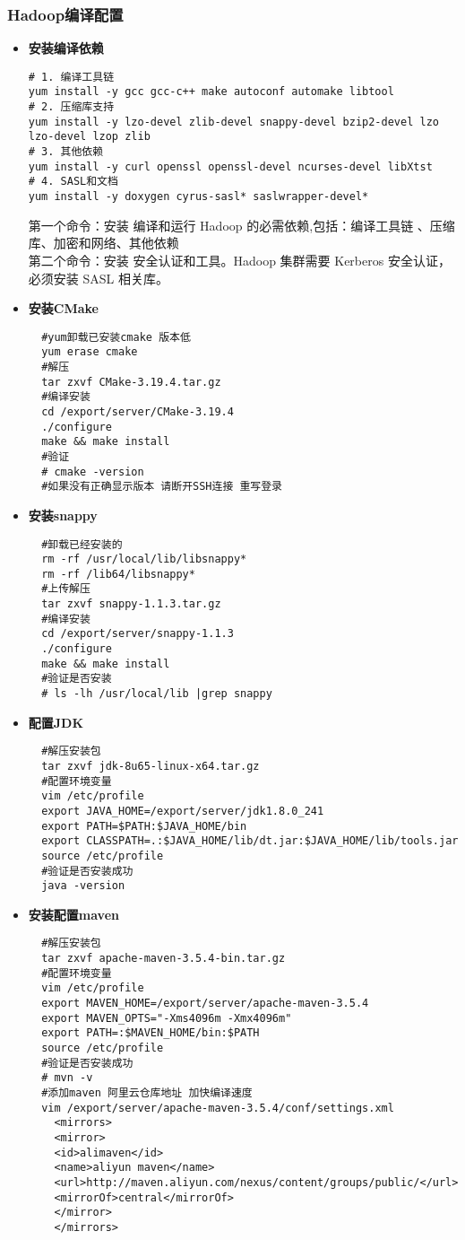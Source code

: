 \documentclass[bachelor]{thesis-uestc}
\begin{document}
\subsubsection{Hadoop编译配置}

\begin{itemize}
\item \textbf{安装编译依赖}
\begin{verbatim}
# 1. 编译工具链
yum install -y gcc gcc-c++ make autoconf automake libtool
# 2. 压缩库支持
yum install -y lzo-devel zlib-devel snappy-devel bzip2-devel lzo 
lzo-devel lzop zlib
# 3. 其他依赖
yum install -y curl openssl openssl-devel ncurses-devel libXtst
# 4. SASL和文档
yum install -y doxygen cyrus-sasl* saslwrapper-devel*
\end{verbatim}
第一个命令：安装 编译和运行 Hadoop 的必需依赖,包括：编译工具链 、压缩库、加密和网络、其他依赖
\\第二个命令：安装 安全认证和工具。Hadoop 集群需要 Kerberos 安全认证，必须安装 SASL 相关库。
\item \textbf{安装CMake}
\begin{verbatim}
  #yum卸载已安装cmake 版本低
  yum erase cmake
  #解压
  tar zxvf CMake-3.19.4.tar.gz
  #编译安装
  cd /export/server/CMake-3.19.4
  ./configure
  make && make install
  #验证
  # cmake -version
  #如果没有正确显示版本 请断开SSH连接 重写登录
\end{verbatim}

\item \textbf{安装snappy}
\begin{verbatim}
  #卸载已经安装的
  rm -rf /usr/local/lib/libsnappy*
  rm -rf /lib64/libsnappy*
  #上传解压
  tar zxvf snappy-1.1.3.tar.gz 
  #编译安装
  cd /export/server/snappy-1.1.3
  ./configure
  make && make install
  #验证是否安装
  # ls -lh /usr/local/lib |grep snappy
\end{verbatim}


\item \textbf{配置JDK}
\begin{verbatim}
  #解压安装包
  tar zxvf jdk-8u65-linux-x64.tar.gz
  #配置环境变量
  vim /etc/profile
  export JAVA_HOME=/export/server/jdk1.8.0_241
  export PATH=$PATH:$JAVA_HOME/bin
  export CLASSPATH=.:$JAVA_HOME/lib/dt.jar:$JAVA_HOME/lib/tools.jar
  source /etc/profile
  #验证是否安装成功
  java -version
\end{verbatim}

\item \textbf{安装配置maven}
\begin{verbatim}
  #解压安装包
  tar zxvf apache-maven-3.5.4-bin.tar.gz
  #配置环境变量
  vim /etc/profile
  export MAVEN_HOME=/export/server/apache-maven-3.5.4
  export MAVEN_OPTS="-Xms4096m -Xmx4096m"
  export PATH=:$MAVEN_HOME/bin:$PATH
  source /etc/profile
  #验证是否安装成功
  # mvn -v
  #添加maven 阿里云仓库地址 加快编译速度
  vim /export/server/apache-maven-3.5.4/conf/settings.xml
    <mirrors>
    <mirror>
    <id>alimaven</id>
    <name>aliyun maven</name>
    <url>http://maven.aliyun.com/nexus/content/groups/public/</url>
    <mirrorOf>central</mirrorOf>
    </mirror>
    </mirrors>
\end{verbatim}


\end{itemize}
\end{document}
